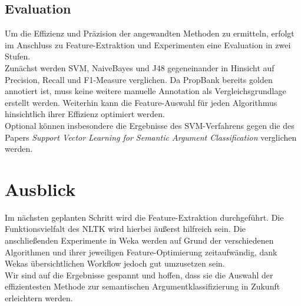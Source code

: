 \documentclass[runningheads]{llncs}
\begin{document}
\subsection{Evaluation}
Um die Effizienz und Pr\"azision der angewandten Methoden zu ermitteln, erfolgt im Anschluss zu Feature-Extraktion und Experimenten eine Evaluation in zwei Stufen.\\
Zun\"achst werden SVM, NaiveBayes und J48 gegeneinander in Hinsicht auf Precision, Recall und F1-Measure verglichen. Da PropBank bereits golden annotiert ist, muss keine weitere manuelle Annotation als Vergleichsgrundlage erstellt werden. Weiterhin kann die Feature-Auswahl f\"ur jeden Algorithmus hinsichtlich ihrer Effizienz optimiert werden.\\
Optional k\"onnen insbesondere die Ergebnisse des SVM-Verfahrens gegen die des Papers \textit{Support Vector Learning for Semantic Argument Classiﬁcation}\cite{svm} verglichen werden.

\section{Ausblick}
Im n\"achsten geplanten Schritt wird die Feature-Extraktion durchgef\"uhrt. Die Funktionsvielfalt des NLTK wird hierbei \"au\ss{}erst hilfreich sein. Die anschlie\ss{}enden Experimente in Weka werden auf Grund der verschiedenen Algorithmen und ihrer jeweiligen Feature-Optimierung zeitaufw\"andig, dank Wekas \"ubersichtlichen Workflow jedoch gut umzusetzen sein.\\
Wir sind auf die Ergebnisse gespannt und hoffen, dass sie die Auswahl der effizientesten Methode zur semantischen Argumentklassifizierung in Zukunft erleichtern werden.

{}

\end{document}
